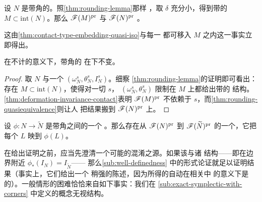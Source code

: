 \begin{corollary}\label{thm:rounding-quasiequivalence}
设 $N$ 是带角的\trExactSymplectic\trManifold。照\cref{thm:rounding-lemma}那样%
\trRoundOffCorners，取 $\delta$ 充分小，得到带\trContactTypeBoundary{}的\trExactSymplectic\trManifold{}
$M\subset\mathrm{int}(N)$。那么 $\mathscr{F}(M)^{\mathrm{pr}}$ 与 $\mathscr{F}(N)^{\mathrm{pr}}$
\trQuasiequivalence。
\end{corollary}
这由\cref{thm:contact-type-embedding-quasi-iso}与每一\trExact\trLagrange\trSubmanifold{}%
都可移入 $M$ 之内这一事实立即得出。
\begin{corollary}\label{thm:deformation-invariance-corners}
在不计\trQuasiequivalence{}的意义下，带角\trExactSymplectic\trManifold{}的\trFukayaCategory{}%
在\trDeformation{}下不变。
\end{corollary}
\begin{proof}
取 $N$ 与一个\trDeformation{} $(\omega_N^s,\theta_N^s,I_N^s)$。细察
\cref{thm:rounding-lemma}的证明即可看出：存在 $M\subset\mathrm{int}(N)$，使得对一切 $s$，
$(\omega_N^s,\theta_N^s)$ 限制在 $M$ 上都给出带\trContactTypeBoundary{}的%
\trExactSymplectic\trManifold{}结构。\cref{thm:deformation-invariance-contact}表明
$\mathscr{F}(M)^{\mathrm{pr}}$ 不依赖于 $s$，而\cref{thm:rounding-quasiequivalence}则让人
把结果搬到 $\mathscr{F}(N)^{\mathrm{pr}}$ 上。
\end{proof}
\begin{corollary}\label{thm:isomorphism-invariance}
设 $\phi\colon N\to\widetilde{N}$ 是带角\trExactSymplectic\trManifold{}之间的一个%
\trIsomorphism。那么存在从 $\mathscr{F}(N)^{\mathrm{pr}}$ 到 $\mathscr{F}(\widetilde{N})^{\mathrm{pr}}$
的一个\trQuasiequivalence，它把每个\trExact\trLagrange\trSubmanifold{} $L$ 映到
$\phi(L)$。
\end{corollary}
在给出证明之前，应当先澄清一个可能的混淆之源。如果该\trIsomorphism{}与诸%
\trAlmostComplex{}结构\trCompatible——即在边界附近 $\phi_*(I_N)=I_{\widetilde{N}}$——%
那么\cref{sub:well-definedness} 中的形式论证就足以证明结果（事实上，它们给出一个%
稍强的陈述，因为所得的\trQuasiequivalence{}自动在相关\trFunctor\trCategory{}中%
\trIsomorphic{}的意义下是\trCanonical{}的）。一般情形的困难恰恰来自如下事实：我们在
\cref{sub:exact-symplectic-with-corners} 中定义的\trIsomorphism{}概念无视\trAlmostComplex{}结构。
